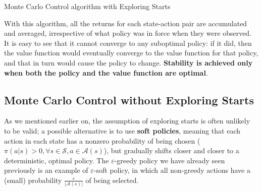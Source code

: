 \begin{algorithm}[H]
\SetAlgoLined
{}

 \caption{Monte Carlo Control algorithm with Exploring Starts}
\end{algorithm}

With this algorithm, all the returns for each state-action pair are accumulated and averaged, irrespective of what policy was in force when they were observed. It is easy to see that it cannot converge to any suboptimal policy: if it did, then the value function would eventually converge to the value function for that policy, and that in turn would cause the policy to change. \textbf{Stability is achieved only when both the policy and the value function are optimal}.

\subsection{Monte Carlo Control without Exploring Starts}
As we mentioned earlier on, the assumption of exploring starts is often unlikely to be valid; a possible alternative is to use \textbf{soft policies}, meaning that each action in each state has a nonzero probability of being chosen ($\pi(a \vert s) > 0, \forall s\in\mathcal{S},a\in\mathcal{A}(s)$), but gradually shifts closer and closer to a deterministic, optimal policy. The $\varepsilon$-greedy policy we have already seen previously is an example of $\varepsilon$-soft policy, in which all non-greedy actions have a (small) probability $\frac{\varepsilon}{\left\vert \mathcal{A}(s) \right\vert}$ of being selected.

